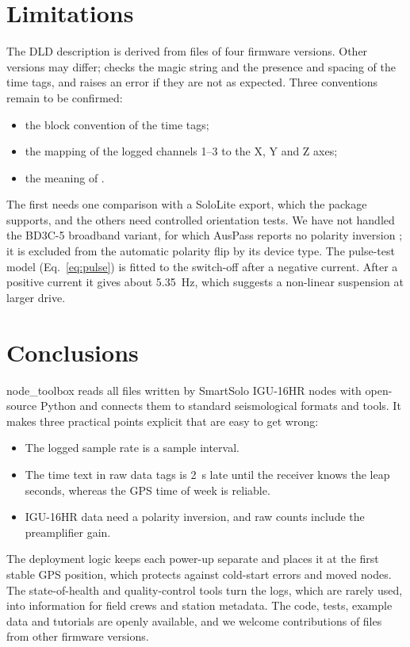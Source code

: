 \documentclass[report]{seismica}
\begin{document}
\section{Limitations}

The DLD description is derived from files of four firmware versions. Other versions may differ;  checks the magic string and the presence and spacing of the time tags, and raises an error if they are not as expected. Three conventions remain to be confirmed:
\begin{itemize}
\item the block convention of the time tags;
\item the mapping of the logged channels 1--3 to the X, Y and Z axes;
\item the meaning of .
\end{itemize}
The first needs one comparison with a SoloLite export, which the package supports, and the others need controlled orientation tests. We have not handled the BD3C-5 broadband variant, for which AusPass reports no polarity inversion \citep{auspass_data}; it is excluded from the automatic polarity flip by its device type. The pulse-test model (Eq.~\ref{eq:pulse}) is fitted to the switch-off after a negative current. After a positive current it gives about 5.35~Hz, which suggests a non-linear suspension at larger drive.

\section{Conclusions}

node\_toolbox reads all files written by SmartSolo IGU-16HR nodes with open-source Python and connects them to standard seismological formats and tools. It makes three practical points explicit that are easy to get wrong:
\begin{itemize}
\item The logged sample rate is a sample interval.
\item The time text in raw data tags is 2~s late until the receiver knows the leap seconds, whereas the GPS time of week is reliable.
\item IGU-16HR data need a polarity inversion, and raw counts include the preamplifier gain.
\end{itemize}
The deployment logic keeps each power-up separate and places it at the first stable GPS position, which protects against cold-start errors and moved nodes. The state-of-health and quality-control tools turn the logs, which are rarely used, into information for field crews and station metadata. The code, tests, example data and tutorials are openly available, and we welcome contributions of files from other firmware versions.
\end{document}
